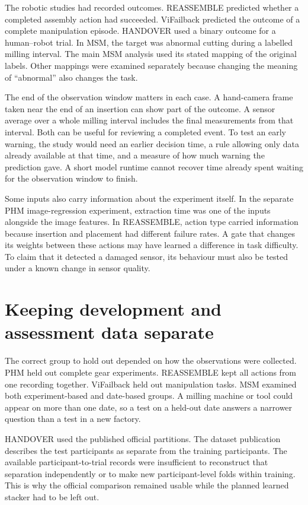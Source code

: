 The robotic studies had recorded outcomes. REASSEMBLE predicted whether a completed assembly action had succeeded. ViFailback predicted the outcome of a complete manipulation episode. HANDOVER used a binary outcome for a human–robot trial. In MSM, the target was abnormal cutting during a labelled milling interval. The main MSM analysis used its stated mapping of the original labels. Other mappings were examined separately because changing the meaning of “abnormal” also changes the task.

The end of the observation window matters in each case. A hand-camera frame taken near the end of an insertion can show part of the outcome. A sensor average over a whole milling interval includes the final measurements from that interval. Both can be useful for reviewing a completed event. To test an early warning, the study would need an earlier decision time, a rule allowing only data already available at that time, and a measure of how much warning the prediction gave. A short model runtime cannot recover time already spent waiting for the observation window to finish.

Some inputs also carry information about the experiment itself. In the separate PHM image-regression experiment, extraction time was one of the inputs alongside the image features. In REASSEMBLE, action type carried information because insertion and placement had different failure rates. A gate that changes its weights between these actions may have learned a difference in task difficulty. To claim that it detected a damaged sensor, its behaviour must also be tested under a known change in sensor quality.

\section{Keeping development and assessment data separate}
\label{sec:ch4-assessment}

The correct group to hold out depended on how the observations were collected. PHM held out complete gear experiments. REASSEMBLE kept all actions from one recording together. ViFailback held out manipulation tasks. MSM examined both experiment-based and date-based groups. A milling machine or tool could appear on more than one date, so a test on a held-out date answers a narrower question than a test in a new factory.

HANDOVER used the published official partitions. The dataset publication describes the test participants as separate from the training participants. The available participant-to-trial records were insufficient to reconstruct that separation independently or to make new participant-level folds within training. This is why the official comparison remained usable while the planned learned stacker had to be left out.

